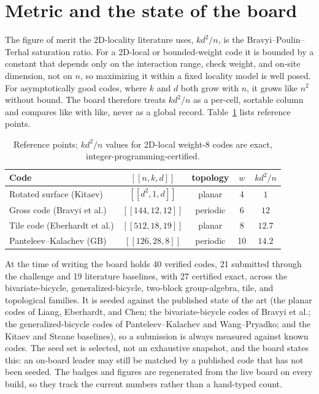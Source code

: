 \documentclass[11pt]{article}
\newcommand{\eff}{kd^2/n}
\begin{document}
\section{Metric and the state of the board}

The figure of merit the 2D-locality literature uses, $\eff$, is the
Bravyi--Poulin--Terhal saturation ratio. For a 2D-local or bounded-weight code it
is bounded by a constant that depends only on the interaction range, check
weight, and on-site dimension, not on $n$, so maximizing it within a fixed
locality model is well posed. For asymptotically good codes, where $k$ and $d$
both grow with $n$, it grows like $n^2$ without bound. The board therefore treats
$\eff$ as a per-cell, sortable column and compares like with like, never as a
global record. Table~\ref{tab:ref} lists reference points.

\begin{table}[h]
\centering
\begin{tabular}{lcccc}
\toprule
Code & $[[n,k,d]]$ & topology & $w$ & $\eff$\\
\midrule
Rotated surface (Kitaev)      & $[[d^2,1,d]]$   & planar   & 4 & $1$\\
Gross code (Bravyi et al.)    & $[[144,12,12]]$ & periodic & 6 & $12$\\
Tile code (Eberhardt et al.)  & $[[512,18,19]]$ & planar   & 8 & $12.7$\\
Panteleev--Kalachev (GB)      & $[[126,28,8]]$  & periodic & 10 & $14.2$\\
\bottomrule
\end{tabular}
\caption{Reference points; $\eff$ values for 2D-local weight-8 codes are
exact, integer-programming-certified.}
\label{tab:ref}
\end{table}

At the time of writing the board holds 40 verified codes, 21 submitted through
the challenge and 19 literature baselines, with 27 certified exact, across the
bivariate-bicycle, generalized-bicycle, two-block group-algebra, tile, and
topological families. It is seeded against the published state of the art (the
planar codes of Liang, Eberhardt, and Chen; the bivariate-bicycle codes of Bravyi
et al.; the generalized-bicycle codes of Panteleev--Kalachev and Wang--Pryadko;
and the Kitaev and Steane baselines), so a submission is always measured against
known codes. The seed set is selected, not an exhaustive snapshot, and the board
states this: an on-board leader may still be matched by a published code that has
not been seeded. The badges and figures are regenerated from the live board on
every build, so they track the current numbers rather than a hand-typed count.
\end{document}
